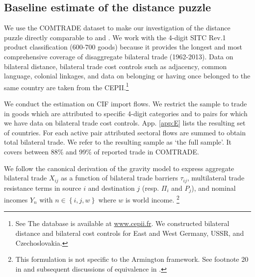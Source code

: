 \documentclass[12pt,twoside,a4paper,notitlepage]{article}
\begin{document}
\subsection{Baseline estimate of the distance puzzle} \label{subsec:baselineDP}
We use the COMTRADE dataset to make our investigation of the distance puzzle directly comparable to \cite{Head2013} and \cite{Berthelon2008}.
We work with the 4-digit SITC Rev.1 product classification (600-700 goods) because it provides the longest and most comprehensive coverage of disaggregate bilateral trade (1962-2013).
Data on bilateral distance, bilateral trade cost controls such as adjacency, common language, colonial linkages, and data on belonging or having once belonged to the same country are taken from the CEPII.\footnote{See \cite{Mayer2011}
	The database is available at \url{www.cepii.fr}.
	We constructed bilateral distance and bilateral cost controls for East and West Germany, USSR, and Czechoslovakia.}


We conduct the estimation on CIF import flows.
We restrict the sample to trade in goods which are attributed to specific 4-digit categories and to pairs for which we have data on bilateral trade cost controls.
App.
\ref{app:E} lists the resulting set of countries.
For each active pair attributed sectoral flows are summed to obtain total bilateral trade.
We refer to the resulting sample as `the full sample'.
It covers between 88\% and 99\% of reported trade in COMTRADE.

We follow the canonical \cite{Anderson2003} derivation of the gravity model to express aggregate bilateral trade $X_{ij}$ as a function of bilateral trade barriers $\tau_{ij}$, multilateral trade resistance terms in source $i$ and destination $j$ (resp.
$\Pi_{i}$ and $P_{j}$), and nominal incomes $Y_{n}$ with $n\in\left\{i,j,w\right\}$ where $w$ is world income.
\footnote{This formulation is not specific to the Armington framework.
See footnote 20 in \cite{Eaton2002} and subsequent discussions of equivalence in  \cite{Arkolakis2012, Head2013}.}
\end{document}
